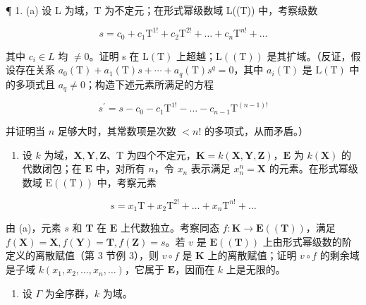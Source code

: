 
¶ 1. (a) 设 L 为域，T 为不定元；在形式幂级数域 L((T)) 中，考察级数

\[
s = c _ {0} + c _ {1} \mathrm{T} ^ {1!} + c _ {2} \mathrm{T} ^ {2!} + \dots + c _ {n} \mathrm{T} ^ {n!} + \dots
\]

其中 \(c_{i} \in L\) 均 \(\neq 0\)。证明 s 在 \(\mathrm{L}(\mathrm{T})\) 上超越；\(\mathrm{L}((\mathrm{T}))\) 是其扩域。（反证，假设存在关系 \(a_{0}(\mathrm{T}) + a_{1}(\mathrm{T})s + \cdots + a_{q}(\mathrm{T})s^{q} = 0\)，其中 \(a_{i}(\mathrm{T})\) 是 \(\mathrm{L}(\mathrm{T})\) 中的多项式且 \(a_{q} \neq 0\)；构造下述元素所满足的方程

\[
s ^ {\prime} = s - c _ {0} - c _ {1} \mathrm{T} ^ {1!} - \dots - c _ {n - 1} \mathrm{T} ^ {(n - 1)!}
\]

并证明当 \(n\) 足够大时，其常数项是次数 \(< n!\) 的多项式，从而矛盾。）

\begin{enumerate}
\def\labelenumi{(\alph{enumi})}
\setcounter{enumi}{1}
\tightlist
\item
  设 \(k\) 为域，\(\mathbf{X}, \mathbf{Y}, \mathbf{Z}\)、\(\mathrm{T}\) 为四个不定元，\(\mathbf{K} = k(\mathbf{X}, \mathbf{Y}, \mathbf{Z})\)，\(\mathbf{E}\) 为 \(k(\mathbf{X})\) 的代数闭包；在 \(\mathbf{E}\) 中，对所有 \(n\)，令 \(x_{n}\) 表示满足 \(x_{n}^{n} = \mathbf{X}\) 的元素。在形式幂级数域 \(\mathrm{E}((\mathrm{T}))\) 中，考察元素
\end{enumerate}

\[
s = x _ {1} \mathrm{T} + x _ {2} \mathrm{T} ^ {2!} + \dots + x _ {n} \mathrm{T} ^ {n!} + \dots
\]

由 (a)，元素 \(s\) 和 \(\mathbf{T}\) 在 \(\mathbf{E}\) 上代数独立。考察同态 \(f\colon \mathbf{K} \to \mathbf{E}((\mathbf{T}))\)，满足 \(f(\mathbf{X}) = \mathbf{X}, f(\mathbf{Y}) = \mathbf{T}, f(\mathbf{Z}) = s\)。若 \(v\) 是 \(\mathbf{E}((\mathbf{T}))\) 上由形式幂级数的阶定义的离散赋值（第 3 节例 3），则 \(v \circ f\) 是 \(\mathbf{K}\) 上的离散赋值；证明 \(v \circ f\) 的剩余域是子域 \(k(x_1, x_2, \ldots, x_n, \ldots)\)，它属于 \(\mathbf{E}\)，因而在 \(k\) 上是无限的。

\begin{enumerate}
\def\labelenumi{\arabic{enumi}.}
\setcounter{enumi}{1}
\tightlist
\item
  设 \(\Gamma\) 为全序群，\(k\) 为域。
\end{enumerate}

